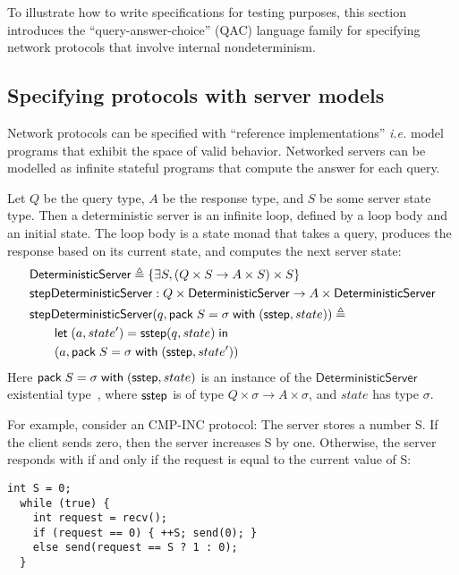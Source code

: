 To illustrate how to write specifications for testing purposes, this section
introduces the ``query-answer-choice'' (QAC) language family for specifying
network protocols that involve internal nondeterminism.

\subsection{Specifying protocols with server models}
Network protocols can be specified with ``reference implementations'' {\it i.e.}
model programs that exhibit the space of valid behavior.  Networked servers can
be modelled as infinite stateful programs that compute the answer for each
query.
\begin{definition}
Let $Q$ be the query type, $A$ be the response type, and $S$ be some server
state type.  Then a deterministic server is an infinite loop, defined by a loop
body and an initial state.  The loop body is a state monad that takes a query,
produces the response based on its current state, and computes the next server
state:
\begin{align*}
  &\mathsf{DeterministicServer}\triangleq\{\exists S,(Q \times S \to A \times S) \times S\} \\
  &\mathsf{stepDeterministicServer}:Q\times \mathsf{DeterministicServer} \to A\times \mathsf{DeterministicServer} \\
  &\mathsf{stepDeterministicServer}(q,\mathsf{pack}\;S=\sigma\;\mathsf{with}\;(\mathsf{sstep}, state))\triangleq\\
  &\qquad\mathsf{let}\;(a,state')=\mathsf{sstep}(q,state)\;\mathsf{in}\; \\
  &\qquad(a, \mathsf{pack}\;S=\sigma\;\mathsf{with}\;(\mathsf{sstep}, state'))
\end{align*}
Here $\mathsf{pack}\;S=\sigma\;\mathsf{with}\;(\mathsf{sstep}, state)$ is an instance of the
$\mathsf{DeterministicServer}$ existential type~\cite{tapl}, where $\mathsf{sstep}$ is
of type $Q\times\sigma\to A\times\sigma$, and $state$ has type $\sigma$.
\end{definition}

For example, consider an CMP-INC protocol: The server stores a number \inlinec S.
If the client sends zero, then the server increases \inlinec S by one.
Otherwise, the server responds with  if and only if the request is
equal to the current value of \inlinec S:
\begin{lstlisting}[style=customc]
  int S = 0;
  while (true) {
    int request = recv();
    if (request == 0) { ++S; send(0); }
    else send(request == S ? 1 : 0);
  }
\end{lstlisting}

